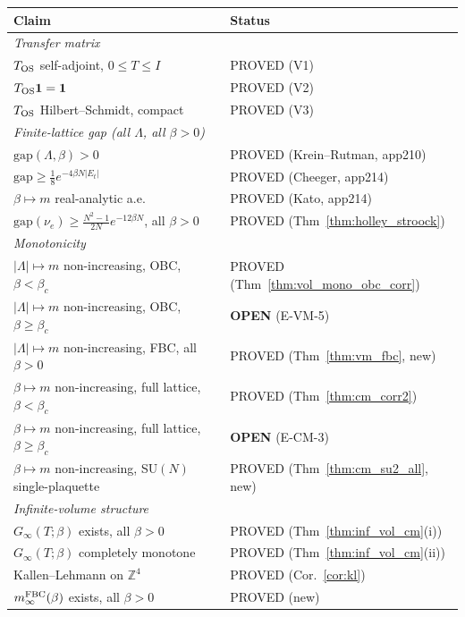 \begin{center}
\renewcommand{\arraystretch}{1.15}
\begin{tabular}{p{9.5cm}|l}
\hline
\textbf{Claim} & \textbf{Status}\\
\hline
\multicolumn{2}{l}{\textit{Transfer matrix}}\\
$T_{\rm OS}$ self-adjoint, $0\le T\le I$ & PROVED (V1)\\
$T_{\rm OS}\mathbf{1}=\mathbf{1}$ & PROVED (V2)\\
$T_{\rm OS}$ Hilbert--Schmidt, compact & PROVED (V3)\\
\hline
\multicolumn{2}{l}{\textit{Finite-lattice gap (all $\Lambda$, all $\beta>0$)}}\\
$\mathrm{gap}(\Lambda,\beta)>0$ & PROVED (Krein--Rutman, app210)\\
$\mathrm{gap}\ge\frac{1}{8}e^{-4\beta N|E_t|}$ & PROVED (Cheeger, app214)\\
$\beta\mapsto m$ real-analytic a.e. & PROVED (Kato, app214)\\
$\mathrm{gap}(\nu_e)\ge\frac{N^2-1}{2N}e^{-12\beta N}$, all $\beta>0$ & PROVED (Thm~\ref{thm:holley_stroock})\\
\hline
\multicolumn{2}{l}{\textit{Monotonicity}}\\
$|\Lambda|\mapsto m$ non-increasing, OBC, $\beta<\beta_c$ & PROVED (Thm~\ref{thm:vol_mono_obc_corr})\\
$|\Lambda|\mapsto m$ non-increasing, OBC, $\beta\ge\beta_c$ & \textbf{OPEN} (E-VM-5)\\
$|\Lambda|\mapsto m$ non-increasing, FBC, all $\beta>0$ & PROVED (Thm~\ref{thm:vm_fbc}, new)\\
$\beta\mapsto m$ non-increasing, full lattice, $\beta<\beta_c$ & PROVED (Thm~\ref{thm:cm_corr2})\\
$\beta\mapsto m$ non-increasing, full lattice, $\beta\ge\beta_c$ & \textbf{OPEN} (E-CM-3)\\
$\beta\mapsto m$ non-increasing, SU$(N)$ single-plaquette & PROVED (Thm~\ref{thm:cm_su2_all}, new)\\
\hline
\multicolumn{2}{l}{\textit{Infinite-volume structure}}\\
$G_{\infty}(T;\beta)$ exists, all $\beta>0$ & PROVED (Thm~\ref{thm:inf_vol_cm}(i))\\
$G_{\infty}(T;\beta)$ completely monotone & PROVED (Thm~\ref{thm:inf_vol_cm}(ii))\\
Kallen--Lehmann on $\mathbb{Z}^4$ & PROVED (Cor.~\ref{cor:kl})\\
$m_{\infty}^{\rm FBC}(\beta)$ exists, all $\beta>0$ & PROVED (new)\\

\end{tabular}
\end{center}
